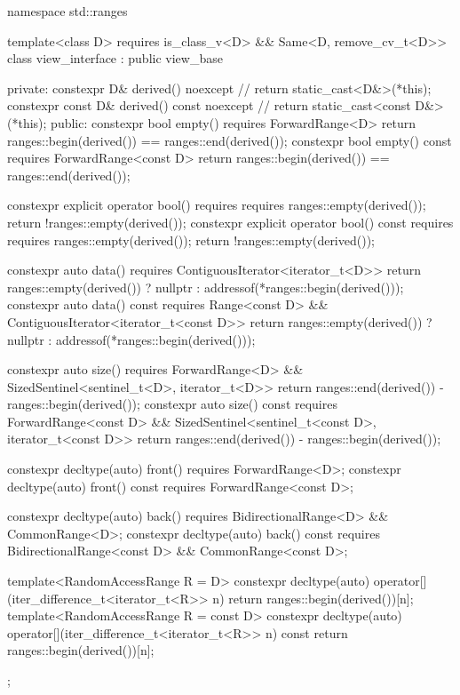 %
\begin{codeblock}
namespace std::ranges {
  template<class D>
    requires is_class_v<D> && Same<D, remove_cv_t<D>>
  class view_interface : public view_base {
  private:
    constexpr D& derived() noexcept {                   // \expos
      return static_cast<D&>(*this);
    }
    constexpr const D& derived() const noexcept {       // \expos
      return static_cast<const D&>(*this);
    }
  public:
    constexpr bool empty() requires ForwardRange<D> {
      return ranges::begin(derived()) == ranges::end(derived());
    }
    constexpr bool empty() const requires ForwardRange<const D> {
      return ranges::begin(derived()) == ranges::end(derived());
    }

    constexpr explicit operator bool()
      requires requires { ranges::empty(derived()); } {
        return !ranges::empty(derived());
      }
    constexpr explicit operator bool() const
      requires requires { ranges::empty(derived()); } {
        return !ranges::empty(derived());
      }

    constexpr auto data() requires ContiguousIterator<iterator_t<D>> {
      return ranges::empty(derived()) ? nullptr : addressof(*ranges::begin(derived()));
    }
    constexpr auto data() const
      requires Range<const D> && ContiguousIterator<iterator_t<const D>> {
        return ranges::empty(derived()) ? nullptr : addressof(*ranges::begin(derived()));
      }

    constexpr auto size() requires ForwardRange<D> &&
      SizedSentinel<sentinel_t<D>, iterator_t<D>> {
        return ranges::end(derived()) - ranges::begin(derived());
      }
    constexpr auto size() const requires ForwardRange<const D> &&
      SizedSentinel<sentinel_t<const D>, iterator_t<const D>> {
        return ranges::end(derived()) - ranges::begin(derived());
      }

    constexpr decltype(auto) front() requires ForwardRange<D>;
    constexpr decltype(auto) front() const requires ForwardRange<const D>;

    constexpr decltype(auto) back() requires BidirectionalRange<D> && CommonRange<D>;
    constexpr decltype(auto) back() const
      requires BidirectionalRange<const D> && CommonRange<const D>;

    template<RandomAccessRange R = D>
      constexpr decltype(auto) operator[](iter_difference_t<iterator_t<R>> n) {
        return ranges::begin(derived())[n];
      }
    template<RandomAccessRange R = const D>
      constexpr decltype(auto) operator[](iter_difference_t<iterator_t<R>> n) const {
        return ranges::begin(derived())[n];
      }
  };
}
\end{codeblock}

